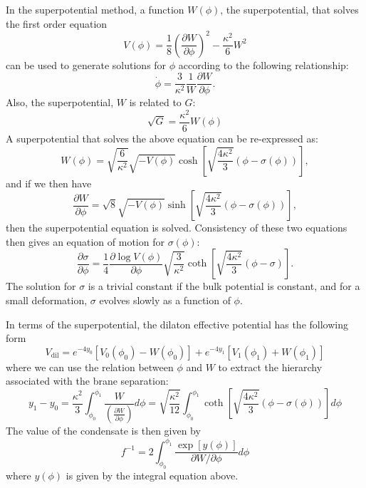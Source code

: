 \documentclass[12pt]{article}
\begin{document}
In the superpotential method, a function $W(\phi)$, the superpotential, that solves the first order equation
\begin{equation}
V(\phi) = \frac{1}{8} \left(\frac{\partial W}{\partial \phi} \right)^2 - \frac{\kappa^2}{6} W^2 
\end{equation}
can be used to generate solutions for $\phi$ according to the following relationship:
\begin{equation}
\dot{\phi} = \frac{3}{\kappa^2} \frac{1}{W} \frac{\partial W}{\partial \phi}.
\end{equation}
Also, the superpotential, $W$ is related to $G$:
\begin{equation}
\sqrt{G} = \frac{\kappa^2}{6} W(\phi)
\end{equation}
A superpotential that solves the above equation can be re-expressed as:
\begin{equation}
W(\phi)  = \sqrt{\frac{6}{\kappa^2}} \sqrt{-V(\phi)} \cosh\left[ \sqrt{\frac{4 \kappa^2}{3}} \left( \phi-\sigma(\phi) \right) \right],
\label{eq:Weq}
\end{equation}
and if we then have
\begin{equation}
\frac{\partial W}{\partial \phi} = \sqrt{8} \sqrt{-V(\phi)} \sinh\left[ \sqrt{\frac{4 \kappa^2}{3}} \left( \phi-\sigma(\phi) \right) \right],
\label{eq:Wpeq}
\end{equation}
then the superpotential equation is solved.  Consistency of these two equations then gives an equation of motion for $\sigma(\phi)$:
\begin{equation}
\frac{\partial \sigma}{\partial \phi} = \frac{1}{4} \frac{\partial \log V(\phi)}{\partial \phi} \sqrt{\frac{3}{\kappa^2}} \coth \left[ \sqrt{\frac{4 \kappa^2}{3}} \left( \phi-\sigma \right) \right].
\end{equation}
The solution for $\sigma$ is a trivial constant if the bulk potential is constant, and for a small deformation, $\sigma$ evolves slowly as a function of $\phi$.

In terms of the superpotential, the dilaton effective potential has the following form 
\begin{equation}
V_\text{dil} = e^{-4 y_0} \left[ V_0 (\phi_0) - W(\phi_0) \right] + e^{-4 y_1} \left[ V_1 (\phi_1) + W(\phi_1) \right] 
\end{equation}
where we can use the relation between $\phi$ and $W$ to extract the hierarchy associated with the brane separation:
\begin{equation}
y_1 -y_0= \frac{\kappa^2}{3} \int_{\phi_0}^{\phi_1} \frac{W}{\left( \frac{ \partial W}{\partial \phi} \right)} d\phi =\sqrt{\frac{\kappa^2}{12}} \int_{\phi_0}^{\phi_1} \coth \left[ \sqrt{\frac{4 \kappa^2}{3}} \left( \phi- \sigma (\phi) \right) \right] d\phi
\end{equation}
The value of the condensate is then given by
\begin{equation}
f^{-1}  =2 \int_{\phi_0}^{\phi_1} \frac{ \exp\left[ y(\phi) \right]}{\partial W/\partial\phi} d \phi
\end{equation}
where $y(\phi)$ is given by the integral equation above. 
\end{document}
